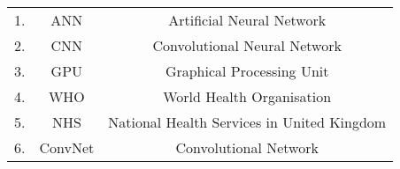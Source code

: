 \begin{longtable}[c]{c|c|c|}

    1. & ANN & Artificial Neural Network \\
    2. & CNN & Convolutional Neural Network \\
    3. & GPU & Graphical Processing Unit \\
    4. & WHO & World Health Organisation \\
    5. & NHS & National Health Services in United Kingdom \\
    6. & ConvNet & Convolutional Network \\ 
\end{longtable}